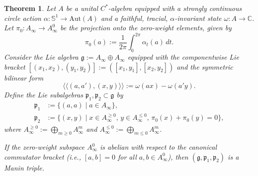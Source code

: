 \documentclass[10pt,a4paper]{amsart}
\newtheorem{theorem}{Theorem}
\begin{document}
\begin{theorem}
Let $A$ be a unital $C^*$-algebra equipped with a strongly continuous circle action $\alpha: \mathbb{S}^1 \rightarrow \text{Aut}(A)$ and a faithful, tracial, $\alpha$-invariant state $\omega: A \rightarrow \mathbb{C}$. Let $\pi_0: A_{\infty} \rightarrow A_{\infty}^0$ be the projection onto the zero-weight elements, given by
\[
\pi_0(a) := \frac{1}{2\pi} \int_0^{2\pi} \alpha_t(a) \, dt.
\]
Consider the Lie algebra $\mathfrak{g} := A_{\infty} \oplus A_{\infty}$ equipped with the componentwise Lie bracket $[(x_1, x_2), (y_1, y_2)] := ([x_1, y_1], [x_2, y_2])$ and the symmetric bilinear form
\[
\langle\langle (a, a'), (x, y) \rangle\rangle := \omega(ax) - \omega(a'y).
\]
Define the Lie subalgebras $\mathfrak{p}_1, \mathfrak{p}_2 \subset \mathfrak{g}$ by
\begin{align*}
\mathfrak{p}_1 &:= \{(a, a) \mid a \in A_{\infty}\}, \\
\mathfrak{p}_2 &:= \{(x, y) \mid x \in A_{\infty}^{\ge 0}, \, y \in A_{\infty}^{\le 0}, \, \pi_0(x) + \pi_0(y) = 0\},
\end{align*}
where $A_{\infty}^{\ge 0} := \bigoplus_{m \ge 0} A_{\infty}^m$ and $A_{\infty}^{\le 0} := \bigoplus_{m \le 0} A_{\infty}^m$. 

If the zero-weight subspace $A_{\infty}^0$ is abelian with respect to the canonical commutator bracket (i.e., $[a, b] = 0$ for all $a, b \in A_{\infty}^0$), then $(\mathfrak{g}, \mathfrak{p}_1, \mathfrak{p}_2)$ is a Manin triple.
\end{theorem}
\end{document}
